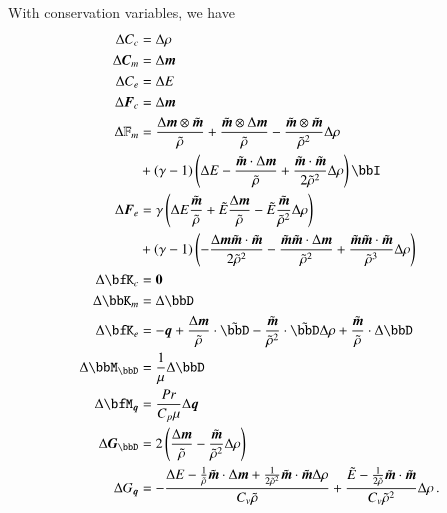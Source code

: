 \documentclass[preprint,12pt]{elsarticle}
\begin{document}
With conservation variables, we have
\begin{align*}
\Delta C_c&=\Delta\rho\\
\Delta\bfC_m&=\Delta\bfm\\
\Delta C_e&=\Delta E\\
%
\Delta\bfF_c&=\Delta\bfm\\
\Delta\mathbb{F}_m&=
\frac{\Delta\bfm\otimes\tilde\bfm}{\tilde\rho}
+\frac{\tilde\bfm\otimes\Delta\bfm}{\tilde\rho}
-\frac{\tilde\bfm\otimes\tilde\bfm}{\tilde\rho^2}\Delta\rho\\
&+(\gamma-1)\LRp{\Delta E
-\frac{\tilde\bfm\cdot\Delta\bfm}{\tilde\rho}
+\frac{\tilde\bfm\cdot\tilde\bfm}{2\tilde\rho^2}\Delta\rho
}\bbI\\
\Delta\bfF_e&=
\gamma\LRp{
\Delta E\frac{\tilde\bfm}{\tilde\rho}
+\tilde E\frac{\Delta\bfm}{\tilde\rho}
-\tilde E\frac{\tilde\bfm}{\tilde\rho^2}\Delta\rho}\\
&+(\gamma-1)\LRp{
-\frac{\Delta\bfm\tilde\bfm\cdot\tilde\bfm}{2\tilde\rho^2}
-\frac{\tilde\bfm\tilde\bfm\cdot\Delta\bfm}{\tilde\rho^2}
+\frac{\tilde\bfm\tilde\bfm\cdot\tilde\bfm}{\tilde\rho^3}\Delta\rho
}\\
%
\Delta\bfK_c&=\bs0\\
\Delta\bbK_m&=\Delta\bbD\\
\Delta\bfK_e&=-\bfq+\frac{\Delta\bfm}{\tilde\rho}\cdot\tilde\bbD
-\frac{\tilde\bfm}{\tilde\rho^2}\cdot\tilde\bbD\Delta\rho
+\frac{\tilde\bfm}{\tilde\rho}\cdot\Delta\bbD\\
%
\Delta\bbM_\bbD&=\frac{1}{\mu}\Delta \bbD\\
\Delta\bfM_{\bfq}&=\frac{Pr}{C_p\mu}\Delta\bfq\\
%
\Delta\bfG_{\bbD}&=2\LRp{\frac{\Delta\bfm}{\tilde\rho}-\frac{\tilde\bfm}{\tilde\rho^2}\Delta\rho}\\
\Delta G_{\bfq}&=-\frac{\Delta E-\frac{1}{\tilde\rho}\tilde\bfm\cdot\Delta\bfm
	+\frac{1}{2\tilde\rho^2}\tilde\bfm\cdot\tilde\bfm\Delta\rho}{C_v\tilde\rho}
	+\frac{\tilde E-\frac{1}{2\tilde\rho}\tilde\bfm\cdot\tilde\bfm}{C_v\tilde\rho^2}\Delta\rho\,.
\end{align*}
\end{document}
